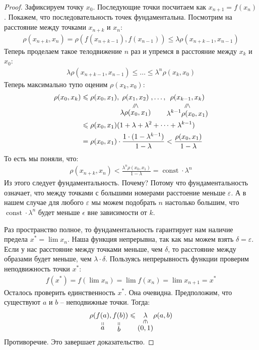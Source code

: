 \begin{proof}
    Зафиксируем точку $x_0$. Последующие точки посчитаем как $x_{n+1} = f(x_n)$. 
    Покажем, что последовательность точек фундаментальна. Посмотрим на расстояние между точками $x_{n+k}$ и $x_{n}$:
    \begin{gather*}
        \rho(x_{n+k}, x_n) = \rho(f(x_{n+k-1}), f(x_{n-1})) \leqslant \lambda \rho(x_{n+k-1}, x_{n-1})
    \end{gather*}
    Теперь проделаем такое телодвижение $n$ раз и упремся в расстояние между $x_k$ и $x_0$:
    \begin{gather*}
        \lambda \rho(x_{n+k-1}, x_{n-1}) \leqslant \dots \leqslant \lambda^n \rho(x_k, x_0)
    \end{gather*}
    Теперь максимально тупо оценим $\rho(x_k, x_0)$: 
    \begin{align*}
        \rho(x_0, x_k) &\leqslant \rho(x_0, x_1), \lessbelow{\rho(x_1, x_2)}{\lambda \rho(x_0, x_1)}, \dots, \lessbelow{\rho(x_{k-1}, x_k)}{\lambda^{k-1} \rho(x_0, x_1)} \\
        &\leqslant \rho(x_0, x_1) (1 + \lambda + \lambda^2 + \dots + \lambda^{k-1}) \\
        &= \rho(x_0, x_1) \cdot \frac{1 \cdot (1 - \lambda^{k-1})}{1 - \lambda} < \frac{\rho(x_0, x_1)}{1 - \lambda}
    \end{align*}
    То есть мы поняли, что:
    \begin{gather*}
        \rho(x_{n+k}, x_n) < \frac{\lambda^n \rho(x_0, x_1)}{1 - \lambda} = \operatorname{const} \cdot \lambda^n
    \end{gather*}
    Из этого следует фундаментальность. Почему? Потому что фундаментальность означает, что между точками с большими номерами расстоение 
    меньше $\varepsilon$. А в нашем случае для любого $\varepsilon$ мы можем подобрать $n$ настолько большим, 
    что $\operatorname{const} \cdot \lambda^n$ будет меньше $\epsilon$ вне зависимости от $k$.

    Раз пространство полное, то фундаментальность гарантирует нам наличие предела $x^* = \lim{x_n}$.
    Наша функция непрерывна, так как мы можем взять $\delta = \varepsilon$. Если у нас расстояние 
    между точками меньше, чем $\delta$, то расстояние между образами будет меньше, чем $\lambda \cdot \delta$. 
    Пользуясь непрерывность функции проверим неподвижность точки $x^*$:
    \begin{gather*}
        f(x^*) = f(\lim{x_n}) = \lim{f(x_n)} = \lim{x_{n+1}} = x^*
    \end{gather*}
    Осталось проверить единственность $x^*$. Она очевидна. Предположим, что существуют $a$ и $b$ -- неподвижные точки. Тогда:
    \begin{gather*}
        \rho(\stackbelow{f(a)}{a}, \stackbelow{f(b)}{b}) \leqslant \inbelow{\lambda}{(0, 1)} \rho(a, b)
    \end{gather*}
    Противоречие. Это завершает доказательство.
\end{proof}
